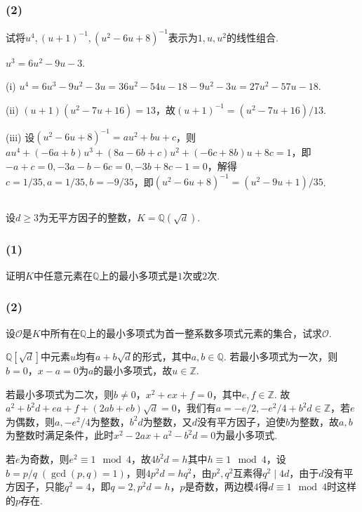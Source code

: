 \subsubsection{(2)}
试将$u^4, (u+1)^{-1}, (u^2-6u+8)^{-1}$表示为$1,u,u^2$的线性组合.

\jie $u^3=6u^2-9u-3$.

(i) $u^4=6u^3-9u^2-3u=36u^2-54u-18-9u^2-3u=27u^2-57u-18$.

(ii) $(u+1)(u^2-7u+16)=13$，故$(u+1)^{-1}=(u^2-7u+16)/13$.

(iii) 设$(u^2-6u+8)^{-1}=au^2+bu+c$，则$au^4+(-6a+b)u^3+(8a-6b+c)u^2+(-6c+8b)u+8c=1$，即$-a+c=0, -3a-b-6c=0, -3b+8c-1=0$，解得$c=1/35, a=1/35, b=-9/35$，即$(u^2-6u+8)^{-1}=(u^2-9u+1)/35$.

\subsection{}
设$d\geq 3$为无平方因子的整数，$K=\mathbb{Q}(\sqrt{d})$.
\subsubsection{(1)}
证明$K$中任意元素在$\mathbb{Q}$上的最小多项式是$1$次或$2$次.

\subsubsection{(2)}
设$\mathcal{O}$是$K$中所有在$\mathbb{Q}$上的最小多项式为首一整系数多项式元素的集合，试求$\mathcal{O}$.
 
\jie $\mathbb{Q}[\sqrt{d}]$中元素$u$均有$a+b\sqrt{d}$的形式，其中$a,b\in\mathbb{Q}$. 若最小多项式为一次，则$b=0$，$x-a=0$为$a$的最小多项式，故$u\in\mathbb{Z}$.

若最小多项式为二次，则$b\neq 0$，$x^2+ex+f=0$，其中$e,f\in\mathbb{Z}$. 故$a^2+b^2d+ea+f+(2ab+eb)\sqrt{d}=0$，我们有$a=-e/2, -e^2/4+b^2d\in\mathbb{Z}$，若$e$为偶数，则$a,-e^2/4$为整数，$b^2d$为整数，又$d$没有平方因子，迫使$b$为整数，故$a,b$为整数时满足条件，此时$x^2-2ax+a^2-b^2d=0$为最小多项式.

若$e$为奇数，则$e^2\equiv 1\mod 4$，故$4b^2d=h$其中$h\equiv 1\mod 4$，设$b=p/q\;(\gcd(p,q)=1)$，则$4p^2d=hq^2$，由$p^2,q^2$互素得$q^2\mid 4d$，由于$d$没有平方因子，只能$q^2=4$，即$q=2,p^2d=h$，$p$是奇数，两边模$4$得$d\equiv 1\mod 4$时这样的$p$存在.


